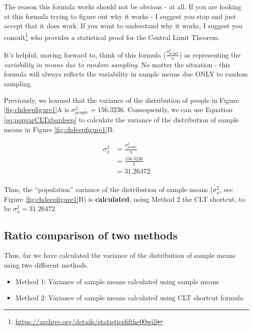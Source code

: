 \documentclass[
]{krantz}
\renewcommand{\href}[2]{#2\footnote{\url{#1}}}
\begin{document}
The reason this formula works should not be obvious - at all. If you are looking at this formula trying to figure out why it works - I suggest you stop and just accept that it does work. If you want to understand why it works, I suggest you \href{https://archive.org/details/statisticsfifthe00will}{consult} \citep{hays1994statistics} who provides a statistical proof for the Central Limit Theorem.

It's helpful, moving forward to, think of this formula (\(\frac{\sigma_{people}^2}{n}\)) as representing the \emph{variability in means due to random sampling}. No matter the situation - this formula will always reflects the variability in sample means due ONLY to random sampling.

Previously, we learned that the variance of the distribution of people in Figure \ref{fig:chdeepfigure1}A is \(\sigma_{people}^2=156.3236\). Consequently, we can use Equation \eqref{eq:popvarCLTxbardeep} to calculate the variance of the distribution of sample means in Figure \ref{fig:chdeepfigure1}B:

\[
\begin{aligned} 
\sigma_{\bar{x}}^2 &= \frac{\sigma_{people}^2}{n}\\
&= \frac{156.3236}{5}\\
&= 31.26472\\
\end{aligned} 
\]

Thus, the ``population'' variance of the distribution of sample means (\(\sigma_{\bar{x}}^2\), see Figure \ref{fig:chdeepfigure1}B) is \textbf{calculated}, using Method 2 the CLT shortcut, to be \(\sigma_{\bar{x}}^2 = 31.26472\).

\hypertarget{ratio-comparison-of-two-methods}{%
\subsection{Ratio comparison of two methods}\label{ratio-comparison-of-two-methods}}

Thus, far we have calculated the variance of the distribution of sample means using two different methods.

\begin{itemize}
\item
  Method 1: Variance of sample means calculated using sample means
\item
  Method 2: Variance of sample means calculated using CLT shortcut formula
\end{itemize}
\end{document}
